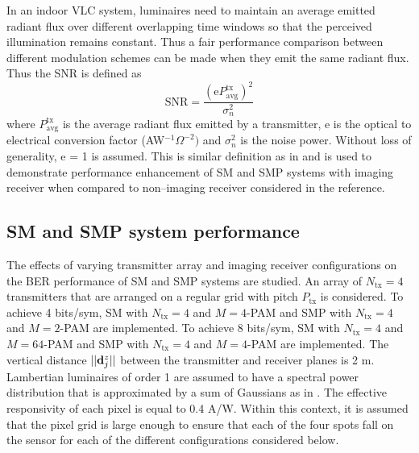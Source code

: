 In an indoor VLC system, luminaires need to maintain an average emitted radiant flux over different overlapping time windows so that the perceived illumination remains constant. Thus a fair performance comparison between different modulation schemes can be made when they emit the same radiant flux. Thus the SNR is defined as
\begin{equation}
  \label{eqOSMSNRTX}
	\text{SNR} = \frac{(\text{e}P_{\text{avg}}^{\text{tx}})^2}{\sigma_{n}^2}
\end{equation}
where $P_{\text{avg}}^{\text{tx}}$ is the average radiant flux emitted by a transmitter, e is the optical to electrical conversion factor (AW$^{-1}\Omega^{-2})$ and $\sigma_{n}^2$ is the noise power. Without loss of generality, e = 1 is assumed. This is similar definition as in \cite{fat13a} and is used to demonstrate performance enhancement of SM and SMP systems with imaging receiver when compared to non--imaging receiver considered in the reference.

\subsection{SM and SMP system performance}
\label{subsec:osmAnalysis}

The effects of varying transmitter array and imaging receiver configurations on the BER performance of SM and SMP systems are studied. An array of $N_{\text{tx}} = 4$ transmitters that are arranged on a regular grid with pitch $P_{\text{tx}}$ is considered. To achieve 4 bits/sym, SM with $N_{\text{tx}}=4$ and $M=4$-PAM and SMP with $N_{\text{tx}}=4$ and $M=2$-PAM are implemented. To achieve 8 bits/sym, SM with $N_{\text{tx}}=4$ and $M=64$-PAM and SMP with $N_{\text{tx}}=4$ and $M=4$-PAM are implemented. The vertical distance $||{\bf{d}}^{z}_{j}||$ between the transmitter and receiver planes is 2 m. Lambertian luminaires of order 1 are assumed to have a spectral power distribution that is approximated by a sum of Gaussians as in \cite{gru08b}. The effective responsivity of each pixel is equal to 0.4 A/W. Within this context, it is assumed that the pixel grid is large enough to ensure that each of the four spots fall on the sensor for each of the different configurations considered below.

